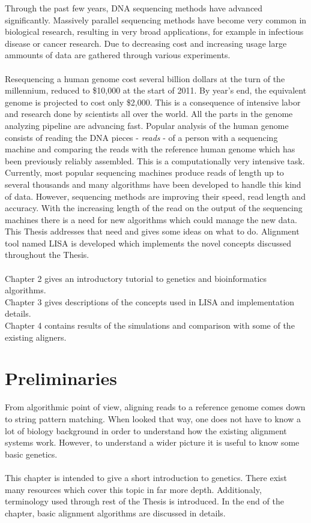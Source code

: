 \documentclass[times, utf8, diplomski]{fer}
\begin{document}
Through the past few years, DNA sequencing methods have advanced significantly. Massively parallel sequencing methods have become very common in biological research, resulting in very broad applications, for example in infectious disease or cancer research. Due to decreasing cost and increasing usage large ammounts of data are gathered through various experiments.\\
\\
Resequencing a human genome cost several billion dollars at the turn of the millennium, reduced to \$10,000 at the start of 2011. By year's end, the equivalent genome is projected to cost only \$2,000\cite{SNAP}. This is a consequence of intensive labor and research done by scientists all over the world. All the parts in the genome analyzing pipeline are advancing fast. Popular analysis of the human genome consists of reading the DNA pieces - \emph{reads} - of a person with a sequencing machine and comparing the reads with the reference human genome which has been previously reliably assembled. This is a computationally very intensive task. Currently, most popular sequencing machines produce reads of length up to several thousands and many algorithms have been developed to handle this kind of data. However, sequencing methods are improving their speed, read length and accuracy. With the increasing length of the read on the output of the sequencing machines there is a need for new algorithms which could manage the new data. This Thesis addresses that need and gives some ideas on what to do. Alignment tool named LISA is developed which implements the novel concepts discussed throughout the Thesis.\\
\\
Chapter 2 gives an introductory tutorial to genetics and bioinformatics algorithms.\\
Chapter 3 gives descriptions of the concepts used in LISA and implementation details.\\
Chapter 4 contains results of the simulations and comparison with some of the existing aligners.

\chapter{Preliminaries}

From algorithmic point of view, aligning reads to a reference genome comes down to string pattern matching. When looked that way, one does not have to know a lot of biology background in order to understand how the existing alignment systems work. However, to understand a wider picture it is useful to know some basic genetics. 
\\
\\
This chapter is intended to give a short introduction to genetics. There exist many resources which cover this topic in far more depth\cite{griffiths}\cite{brown}. Additionaly, terminology used through rest of the Thesis is introduced. In the end of the chapter, basic alignment algorithms are discussed in details.
\end{document}
